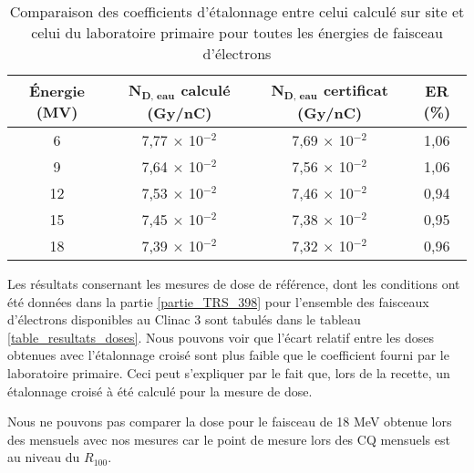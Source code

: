 \documentclass{article}
\begin{document}
\begin{table}[h]
  \centering
  \begin{tabular}{cccc}
    \toprule
    \textbf{Énergie (MV)} & $\mathbf{N_{D,\, eau}}$ \textbf{calculé (Gy/nC)} & $\mathbf{N_{D,\, eau}}$ \textbf{certificat (Gy/nC)} & \textbf{ER (\%)} \\
    \toprule
    6 & 7,77 $\times$ 10$^{-2}$ & 7,69 $\times$ 10$^{-2}$ & 1,06 \\
    9 & 7,64 $\times$ 10$^{-2}$ & 7,56 $\times$ 10$^{-2}$ & 1,06 \\
    12 & 7,53 $\times$ 10$^{-2}$ & 7,46 $\times$ 10$^{-2}$ & 0,94 \\
    15 & 7,45 $\times$ 10$^{-2}$ & 7,38 $\times$ 10$^{-2}$ & 0,95 \\
    18 & 7,39 $\times$ 10$^{-2}$ & 7,32 $\times$ 10$^{-2}$ & 0,96 \\
    \bottomrule
  \end{tabular}
  \caption{Comparaison des coefficients d'étalonnage entre celui calculé sur site et celui du laboratoire primaire pour toutes les énergies de faisceau d'électrons}
  \label{table_coeff_etal_energies}
\end{table}

Les résultats consernant les mesures de dose de référence, dont les conditions ont été données dans la partie \ref*{partie_TRS_398} pour l'ensemble des faisceaux d'électrons disponibles au Clinac 3 sont tabulés dans le tableau \ref*{table_resultats_doses}. Nous pouvons voir que l'écart relatif entre les doses obtenues avec l'étalonnage croisé sont plus faible que le coefficient fourni par le laboratoire primaire. Ceci peut s'expliquer par le fait que, lors de la recette, un étalonnage croisé à été calculé pour la mesure de dose.

Nous ne pouvons pas comparer la dose pour le faisceau de 18 MeV obtenue lors des mensuels avec nos mesures car le point de mesure lors des CQ mensuels est au niveau du $R_{100}$.
\end{document}
